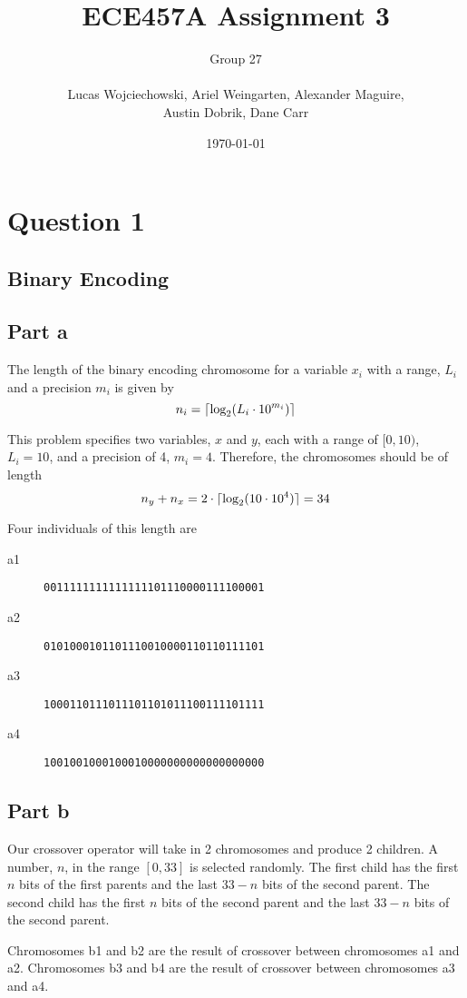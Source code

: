 \documentclass[a4paper]{article}
\title{ECE457A Assignment 3}
\author{
  Group 27 \\
  \\
  Lucas Wojciechowski, Ariel Weingarten, Alexander Maguire, \\
  Austin Dobrik, Dane Carr}
\date{\today}
\DeclarePairedDelimiter\ceil{\lceil}{\rceil}
\begin{document}
\maketitle

\section{Question 1}

\subsection{Binary Encoding}
\subsection{Part a}

The length of the binary encoding chromosome for a variable $x_i$ with a range, $L_i$ and a precision $m_i$ is given by
$$n_i = \ceil{\text{log}_2(L_i \cdot 10^{m_i})}$$

This problem specifies two variables, $x$ and $y$, each with a range of $[0, 10)$, $L_i = 10$, and a precision of 4, $m_i = 4$. Therefore, the chromosomes should be of length
$$n_y + n_x = 2 \cdot \ceil{\text{log}_2(10 \cdot 10^4)} = 34$$

Four individuals of this length are
\begin{description}
\item[a1] \texttt{0011111111111111101110000111100001}
\item[a2] \texttt{0101000101101110010000110110111101}
\item[a3] \texttt{1000110111011101101011100111101111}
\item[a4] \texttt{1001001000100010000000000000000000}
\end{description}

\subsection{Part b}
Our crossover operator will take in 2 chromosomes and produce 2 children. A number, $n$, in the range $[0, 33]$ is selected randomly. The first child has the first $n$ bits of the first parents and the last $33-n$ bits of the second parent. The second child has the first $n$ bits of the second parent and the last $33-n$ bits of the second parent.

Chromosomes b1 and b2 are the result of crossover between chromosomes a1 and a2. Chromosomes b3 and b4 are the result of crossover between chromosomes a3 and a4.
\end{document}
